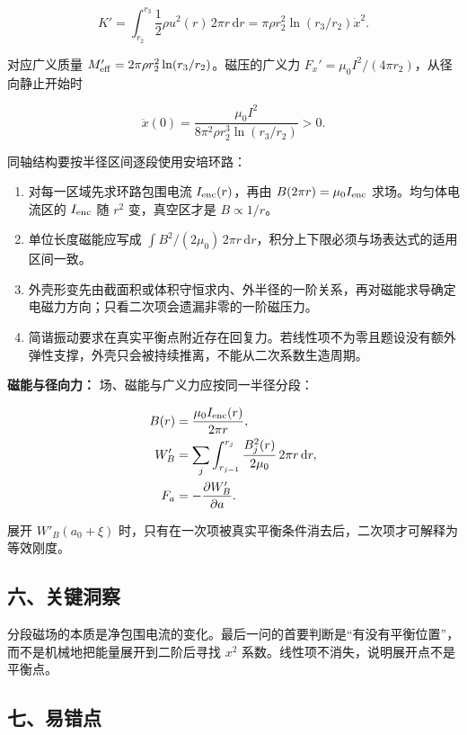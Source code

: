 \documentclass[12pt,a4paper,UTF8]{ctexart}
\newcommand{\tightlist}{\setlength{\itemsep}{0pt}\setlength{\parskip}{0pt}}
\begin{document}
\[K'=\int_{r_2}^{r_3}\frac12\rho u^2(r)\,2\pi r\,\mathrm dr=\pi\rho r_2^2\ln(r_3/r_2)\dot x^2.\]

对应广义质量 \(M_{\rm eff}'=2\pi\rho r_2^2\ln(r_3/r_2)\)。磁压的广义力
\(F_x'=\mu_0I^2/(4\pi r_2)\)，从径向静止开始时

\[\ddot x(0)=\frac{\mu_0I^2}{8\pi^2\rho r_2^3\ln(r_3/r_2)}>0.\]

同轴结构要按半径区间逐段使用安培环路：

\begin{enumerate}
\def\labelenumi{\arabic{enumi}.}
\tightlist
\item
  对每一区域先求环路包围电流 \(I_{\rm enc}(r)\)，再由
  \(B(2\pi r)=\mu_0I_{\rm enc}\) 求场。均匀体电流区的 \(I_{\rm enc}\) 随
  \(r^2\) 变，真空区才是 \(B\propto1/r\)。
\item
  单位长度磁能应写成
  \(\int B^2/(2\mu_0)\,2\pi r\,\mathrm dr\)，积分上下限必须与场表达式的适用区间一致。
\item
  外壳形变先由截面积或体积守恒求内、外半径的一阶关系，再对磁能求导确定电磁力方向；只看二次项会遗漏非零的一阶磁压力。
\item
  简谐振动要求在真实平衡点附近存在回复力。若线性项不为零且题设没有额外弹性支撑，外壳只会被持续推离，不能从二次系数生造周期。
\end{enumerate}

\textbf{磁能与径向力：} 场、磁能与广义力应按同一半径分段：

\[\begin{aligned}
B(r)&=\frac{\mu_0I_{\rm enc}(r)}{2\pi r},\\
W'_B&=\sum_j\int_{r_{j-1}}^{r_j}
\frac{B_j^2(r)}{2\mu_0}\,2\pi r\,\mathrm dr,\\
F_a&=-\frac{\partial W'_B}{\partial a}.
\end{aligned}\]

展开 \(W'_B(a_0+\xi)\)
时，只有在一次项被真实平衡条件消去后，二次项才可解释为等效刚度。

\subsection{六、关键洞察}\label{ux516dux5173ux952eux6d1eux5bdf-3}

分段磁场的本质是净包围电流的变化。最后一问的首要判断是``有没有平衡位置''，而不是机械地把能量展开到二阶后寻找
\(x^2\) 系数。线性项不消失，说明展开点不是平衡点。

\subsection{七、易错点}\label{ux4e03ux6613ux9519ux70b9-3}
\end{document}
